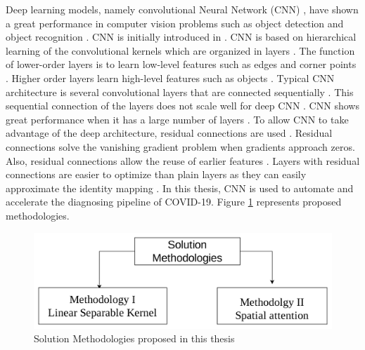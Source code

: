 Deep learning \cite{lecun2015deep} models, namely convolutional Neural Network (CNN) \cite{lecun1989handwritten}, have shown a great performance in computer vision problems such as object detection \cite{erhan2014scalable}\cite{girshick2014rich}\cite{sermanet2013overfeat}\cite{redmon2016you} and object recognition \cite{simonyan2014very}\cite{he2016deep}. CNN is initially introduced in \cite{lecun1989handwritten}. CNN  is based on hierarchical learning of the convolutional kernels which are organized in layers \cite{krizhevsky2012imagenet}. The function of lower-order layers is to learn low-level features such as edges and corner points \cite{zeiler2014visualizing}. Higher order layers learn high-level features such as objects \cite{zeiler2014visualizing}. Typical CNN architecture is several convolutional layers that are connected sequentially \cite{simonyan2014very}. This sequential connection of the layers does not scale well for deep CNN \cite{he2016deep}. CNN shows great performance when it has a large number of layers \cite{he2016deep}. To allow CNN to take advantage of the deep architecture, residual connections are used \cite{he2016deep}. Residual connections solve the vanishing gradient problem when gradients approach zeros. Also, residual connections allow the reuse of earlier features \cite{huang2017densely}. Layers with residual connections are easier to optimize than plain layers as they can easily approximate the identity mapping \cite{he2016deep}. In this thesis, CNN is used to automate and accelerate the diagnosing pipeline of COVID-19. Figure \ref{solMeth} represents proposed methodologies.


\begin{figure}%
    \centering
        \includegraphics[width=\textwidth]{Figures/SolutionMethodologies.png}
        \caption{Solution Methodologies proposed in this thesis}
        \label{solMeth}
\end{figure}


